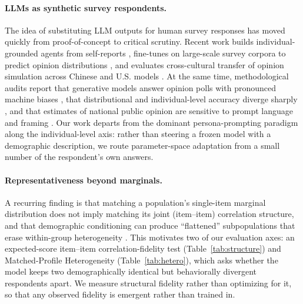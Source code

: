 \documentclass[letterpaper]{article} %
\begin{document}
\paragraph{LLMs as synthetic survey respondents.}
The idea of substituting LLM outputs for human survey responses has moved
quickly from proof-of-concept to critical scrutiny. Recent work builds
individual-grounded agents from self-reports \citep{park2024agents},
fine-tunes on large-scale survey corpora to predict opinion distributions
\citep{suh2025language}, and evaluates cross-cultural transfer of opinion
simulation across Chinese and U.S. models \citep{qi2025crosscultural}. At the
same time, methodological audits report that generative models answer opinion
polls with pronounced machine biases \citep{boelaert2025machine}, that
distributional and individual-level accuracy diverge sharply
\citep{miranda2025simulating}, and that estimates of national public opinion
are sensitive to prompt language and framing
\citep{heyde2024populi,bult2025llms}. Our work departs from the dominant
persona-prompting paradigm along the individual-level axis: rather than
steering a frozen model with a demographic description, we route
parameter-space adaptation from a small number of the respondent's own
answers.

\paragraph{Representativeness beyond marginals.}
A recurring finding is that matching a population's single-item marginal
distribution does not imply matching its joint (item--item) correlation
structure, and that demographic conditioning can produce ``flattened''
subpopulations that erase within-group heterogeneity
\citep{williams2026beyond,wang2026parametric}. This motivates two of our
evaluation axes: an expected-score item--item correlation-fidelity test
(Table~\ref{tab:structure}) and Matched-Profile Heterogeneity
(Table~\ref{tab:hetero}), which asks whether the model keeps two
demographically identical but behaviorally divergent respondents apart. We
measure structural fidelity rather than optimizing for it, so that any observed
fidelity is emergent rather than trained in.
\end{document}
